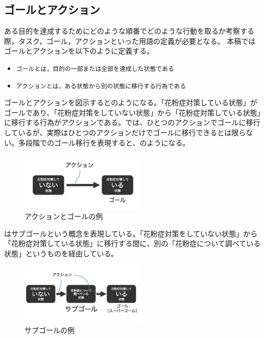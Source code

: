 \documentclass[submit,techreq]{ipsj}
\def\|{\verb|}
\begin{document}
%3.1
\subsection{ゴールとアクション}
ある目的を達成するためにどのような順番でどのような行動を取るか考察する際，タスク，ゴール，アクションといった用語の定義が必要となる。
本稿ではゴールとアクションを以下のように定義する。

\begin{itemize}
\item \|ゴールとは，目的の一部または全部を達成した状態である|
\item \|アクションとは，ある状態から別の状態に移行する行為である|
\end{itemize}

ゴールとアクションを図示するとのようになる。「花粉症対策している状態」がゴールであり、「花粉症対策をしていない状態」から「花粉症対策している状態」に移行する行為がアクションである。では、ひとつのアクションでゴールに移行しているが、実際はひとつのアクションだけでゴールに移行できるとは限らない。多段階でのゴール移行を表現すると、のようになる。

\begin{figure}[tb]
\includegraphics[width=6cm, bb=0 0 400 300]{action_goal.jpg}
\caption{アクションとゴールの例}
\label{fig:action_goal}
\end{figure}

はサブゴールという概念を表現している。「花粉症対策をしていない状態」から「花粉症対策している状態」に移行する間に、別の「花粉症について調べている状態」というものを経由している。


\begin{figure}[tb]
\includegraphics[width=6cm, bb=0 0 450 300]{sub_goal.jpg}
\caption{サブゴールの例}
\label{fig:sub_goal}
\end{figure}
\end{document}
